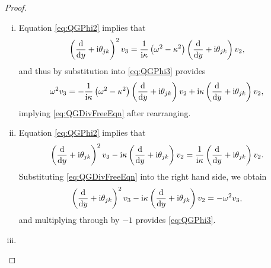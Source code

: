 \begin{proof}
	\begin{enumerate}[(i)]
		\item Equation \eqref{eq:QGPhi2} implies that
		\begin{align*}
			\left( \dfrac{\mathrm{d}}{\mathrm{d}y}+\mathrm{i}\theta_{jk} \right)^2 v_3 &= \frac{1}{\mathrm{i}\kappa}\left( \omega^2 - \kappa^2 \right)\left( \dfrac{\mathrm{d}}{\mathrm{d}y}+\mathrm{i}\theta_{jk} \right)v_2,
		\end{align*}
		and thus by substitution into \eqref{eq:QGPhi3} provides
		\begin{align*}
			\omega^2 v_3 &= 
			-\frac{1}{\mathrm{i}\kappa}\left( \omega^2 - \kappa^2 \right)\left( \dfrac{\mathrm{d}}{\mathrm{d}y}+\mathrm{i}\theta_{jk} \right)v_2
			+ \mathrm{i}\kappa\left( \dfrac{\mathrm{d}}{\mathrm{d}y}+\mathrm{i}\theta_{jk} \right)v_2,
		\end{align*}
		implying \eqref{eq:QGDivFreeEqn} after rearranging.
		\item Equation \eqref{eq:QGPhi2} implies that
		\begin{align*}
			\left( \dfrac{\mathrm{d}}{\mathrm{d}y}+\mathrm{i}\theta_{jk} \right)^2 v_3 - \mathrm{i}\kappa\left( \dfrac{\mathrm{d}}{\mathrm{d}y}+\mathrm{i}\theta_{jk} \right)v_2
			&= \frac{1}{\mathrm{i}\kappa}\left( \dfrac{\mathrm{d}}{\mathrm{d}y}+\mathrm{i}\theta_{jk} \right)v_2.
		\end{align*}
		Substituting \eqref{eq:QGDivFreeEqn} into the right hand side, we obtain
		\begin{align*}
			\left( \dfrac{\mathrm{d}}{\mathrm{d}y}+\mathrm{i}\theta_{jk} \right)^2 v_3 - \mathrm{i}\kappa\left( \dfrac{\mathrm{d}}{\mathrm{d}y}+\mathrm{i}\theta_{jk} \right)v_2
			&= -\omega^2 v_3,
		\end{align*}
		and multiplying through by $-1$ provides \eqref{eq:QGPhi3}.
		\item {}
	\end{enumerate}
\end{proof}